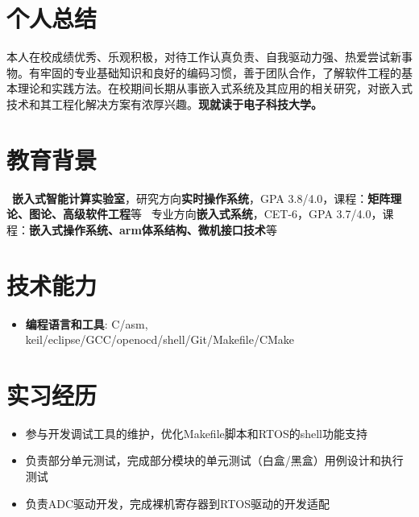 \documentclass{resume}
\begin{document}


 
\section{个人总结}
本人在校成绩优秀、乐观积极，对待工作认真负责、自我驱动力强、热爱尝试新事物。有牢固的专业基础知识和良好的编码习惯，善于团队合作，了解软件工程的基本理论和实践方法。在校期间长期从事嵌入式系统及其应用的相关研究，对嵌入式技术和其工程化解决方案有浓厚兴趣。\textbf{现就读于电子科技大学。}

\section{教育背景}
\ \textbf{嵌入式智能计算实验室}，研究方向\textbf{实时操作系统}，GPA 3.8/4.0，课程：\textbf{矩阵理论、图论、高级软件工程}等
\ 专业方向\textbf{嵌入式系统}，CET-6，GPA 3.7/4.0，课程：\textbf{嵌入式操作系统、arm体系结构、微机接口技术}等

\section{技术能力}
\begin{itemize}[parsep=0.2ex]
  \item \textbf{编程语言和工具}: C/asm, keil/eclipse/GCC/openocd/shell/Git/Makefile/CMake
\end{itemize}


\section{实习经历}
\begin{itemize}
  \item 参与开发调试工具的维护，优化Makefile脚本和RTOS的shell功能支持
  \item 负责部分单元测试，完成部分模块的单元测试（白盒/黑盒）用例设计和执行测试
  \item 负责ADC驱动开发，完成裸机寄存器到RTOS驱动的开发适配
\end{itemize}
\end{document}
